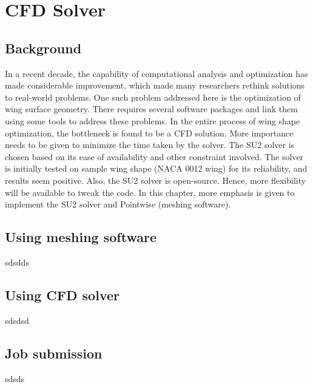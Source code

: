 \chapter{CFD Solver}
\label{solver}
\section{Background}
In a recent decade, the capability of computational analysis and optimization has made considerable improvement, which made many researchers rethink solutions to real-world problems. One such problem addressed here is the optimization of wing surface geometry. There requires several software packages and link them using some tools to address these problems. In the entire process of wing shape optimization, the bottleneck is found to be a CFD solution. More importance needs to be given to minimize the time taken by the solver. The SU2 solver is chosen based on its ease of availability and other constraint involved. The solver is initially tested on sample wing shape (NACA 0012 wing) for its reliability, and results seem positive. Also, the SU2 solver is open-source. Hence, more flexibility will be available to tweak the code. In this chapter, more emphasis is given to implement the SU2 solver and Pointwise (meshing software).

\section{Using meshing software}
sdsdds

\section{Using CFD solver}
sdsdsd
\section{Job submission}
sdsds